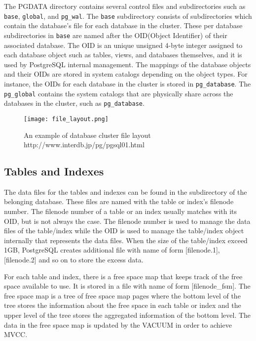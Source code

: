 \documentclass[a4paper]{article}
\begin{document}
The PGDATA directory contains several control files and subdirectories such as \texttt{base}, \texttt{global}, and \texttt{pg\_wal}. The \texttt{base} subdirectory consists of subdirectories which contain the database’s file for each database in the cluster. These per database subdirectories in \texttt{base} are named after the OID(Object Identifier) of their associated database. The OID is an unique unsigned 4-byte integer assigned to each database object such as tables, views, and databases themselves, and it is used by PostgreSQL internal management\cite{1}. The mappings of the database objects and their OIDs are stored in system catalogs depending on the object types. For instance, the OIDs for each database in the cluster is stored in \texttt{pg\_database}. The \texttt{pg\_global} contains the system catalogs that are physically share across the databases in the cluster, such as \texttt{pg\_database}.

\begin{figure}[H]
\centering
\texttt{[image: file\_layout.png]}
\caption{An example of database cluster file layout\\http://www.interdb.jp/pg/pgsql01.html }
\end{figure}

\subsection{Tables and Indexes}
The data files for the tables and indexes can be found in the subdirectory of the belonging database. These files are named with the table or index’s filenode number. The filenode number of a table or an index usually matches with its OID, but is not always the case. The filenode number is used to manage the data files of the table/index while the OID is used to  manage the table/index object internally that represents the data files. When the size of the table/index exceed 1GB, PostgreSQL creates additional file with name of form [filenode.1], [filenode.2] and so on to store the excess data.

For each table and index, there is a free space map that keeps track of the free space available to use. It is stored in a file with name of form [filenode\_fsm]. The free space map is a tree of free space map pages where the bottom level of the tree stores the information about the free space in each table or index and the upper level of the tree stores the aggregated information of the bottom level. The data in the free space map is updated by the VACUUM in order to achieve MVCC. 
\end{document}
